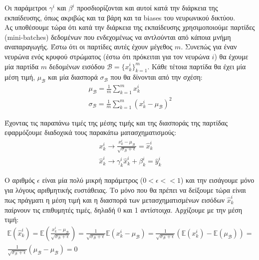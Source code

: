 \documentclass[11pt]{article} %
\numberwithin{equation}{subsection}
\begin{document}
Οι παράμετροι $\gamma^i$ και $\beta^i$ προσδιορίζονται και αυτοί κατά την διάρκεια της εκπαίδευσης, όπως ακριβώς και τα βάρη και τα biases του νευρωνικού  δικτύου.\\

Ας υποθέσουμε τώρα ότι κατά την διάρκεια της εκπαίδευσης χρησιμοποιούμε παρτίδες (mini-batches) δεδομένων που ενδεχομένως να αντλούνται από κάποια μνήμη αναπαραγωγής. Έστω ότι οι παρτίδες αυτές έχουν μέγεθος $m$. Συνεπώς για έναν νευρώνα ενός κρυφού στρώματος (έστω ότι πρόκειται για τον νευρώνα $i$)  θα έχουμε μία παρτίδα $m$ δεδομένων εισόδου $ \mathcal{B} = \{x_k^i\}_{k=1}^m$. Κάθε τέτοια παρτίδα θα έχει μία μέση τιμή, $\mu_{\mathcal{B}}$ και μία διασπορά $\sigma_{\mathcal{B}}$ που θα δίνονται από την σχέση:
\begin{align*}
\mu_{\mathcal{B}} = \frac{1}{m} \sum_{k=1}^{m} x_k^i\\
\sigma_{\mathcal{B}} = \frac{1}{m} \sum_{k=1}^{m} (x_k^i -\mu_{\mathcal{B}} )^2
\end{align*}

Έχοντας τις παραπάνω τιμές της μέσης τιμής και της διασποράς της παρτίδας εφαρμόζουμε διαδοχικά τους παρακάτω ματασχηματισμούς:
\begin{align*}
x_k^i \rightarrow \frac{x_k^i - \mu_{\mathcal{B}}}{\sqrt{\sigma_{\mathcal{B}} + \epsilon}} = \hat{x}_k^i\\
\hat{x}_k^i \rightarrow \gamma_k^i \hat{x}_k^i + \beta_k^i = \hat{y}_k^i
\end{align*}

Ο αριθμός $\epsilon$ είναι μία πολύ μικρή παράμετρος ($0 < \epsilon << 1$) και την εισάγουμε μόνο για λόγους αριθμητικής ευστάθειας. Το μόνο που θα πρέπει να δείξουμε τώρα είναι πως πράγματι η μέση τιμή και η διασπορά των μετασχηματισμένων εισόδων $\hat{x}_k^i$ παίρνουν τις επιθυμητές τιμές, δηλαδή 0 και 1 αντίστοιχα. Αρχίζουμε με την μέση τιμή:
\begin{align*}
\mathbb{E}(\hat{x}_k^i) = \mathbb{E}\left( \frac{x_k^i - \mu_{\mathcal{B}}}{\sqrt{\sigma_{\mathcal{B}} + \epsilon}}\right) = \frac{1}{\sqrt{\sigma_{\mathcal{B}} + \epsilon}} \mathbb{E} (x_k^i - \mu_{\mathcal{B}}) = \frac{1}{\sqrt{\sigma_{\mathcal{B}} + \epsilon}} (\mathbb{E}(x_k^i) - \mathbb{E}(\mu_{\mathcal{B}})) =  \\
\frac{1}{\sqrt{\sigma_{\mathcal{B}} + \epsilon}} (\mu_{\mathcal{B}} - \mu_{\mathcal{B}}) = 0\\
\end{align*}
\end{document}
